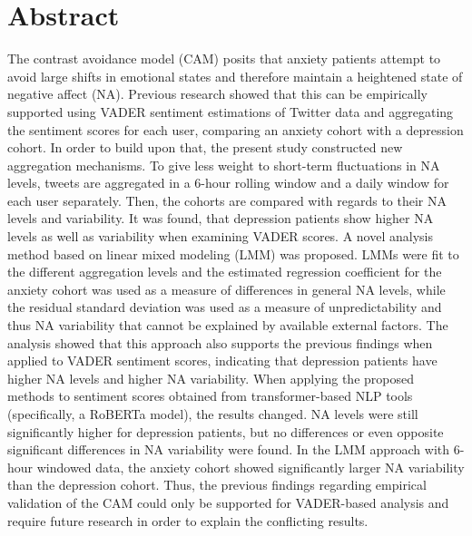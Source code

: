 


\section*{Abstract}

The contrast avoidance model (CAM) posits that anxiety patients attempt to avoid large shifts in emotional states and therefore maintain a heightened state of negative affect (NA). Previous research showed that this can be empirically supported using VADER sentiment estimations of Twitter data and aggregating the sentiment scores for each user, comparing an anxiety cohort with a depression cohort. In order to build upon that, the present study constructed new aggregation mechanisms. To give less weight to short-term fluctuations in NA levels, tweets are aggregated in a 6-hour rolling window and a daily window for each user separately. Then, the cohorts are compared with regards to their NA levels and variability. It was found, that depression patients show higher NA levels as well as variability when examining VADER scores. A novel analysis method based on linear mixed modeling (LMM) was proposed. LMMs were fit to the different aggregation levels and the estimated regression coefficient for the anxiety cohort was used as a measure of differences in general NA levels, while the residual standard deviation was used as a measure of unpredictability and thus NA variability that cannot be explained by available external factors. The analysis showed that this approach also supports the previous findings when applied to VADER sentiment scores, indicating that depression patients have higher NA levels and higher NA variability. When applying the proposed methods to sentiment scores obtained from transformer-based NLP tools (specifically, a RoBERTa model), the results changed. NA levels were still significantly higher for depression patients, but no differences or even opposite significant differences in NA variability were found. In the LMM approach with 6-hour windowed data, the anxiety cohort showed significantly larger NA variability than the depression cohort. Thus, the previous findings regarding empirical validation of the CAM could only be supported for VADER-based analysis and require future research in order to explain the conflicting results.
